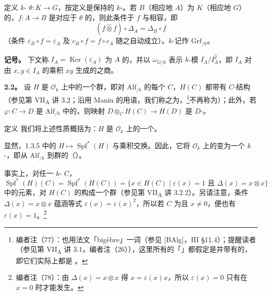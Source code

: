 \begin{SGAresult}{定义}{}
$k$- $\theta:K\to G$，按定义是保持的 $k$-。若 $B$（相应地 $A$）为 $K$（相应地 $G$）的，$f:A\to B$ 是对应于 $\theta$ 的，则此条件于 $f$ 与相容，即
\[
(f\widehat\otimes f)\circ\Delta_A=\Delta_B\circ f
\]
（条件 $\varepsilon_B\circ f=\varepsilon_A$ 及 $c_B\circ f=f\circ c_A$ 随之自动成立）。$k$-记作 $\mathrm{Grf}_{/k}$。
\end{SGAresult}

\textbf{记号。} 下文称 $I_A=\operatorname{Ker}(\varepsilon_A)$ 为 $A$ 的，并以 $\omega_{G/k}$ 表示 $k$-模 $I_A/\overline{I_A^2}$，即 $I_A$ 对由 $x,y\in I_A$ 的乘积 $xy$ 生成的之商。

\textbf{2.2。} 设 $H$ 是 $\mathscr O_k$ 上中的一个群，即对 $\mathrm{Alf}_{/k}$ 的每个 $C$，$H(C)$ 都带有 $C$-结构（参见第 VII\textsubscript{A} 讲 3.2；沿用 Manin 的用语，我们称之为，\footnote{编者注（77）：也用法文「bigèbre」一词（参见 [BAlg]，III §11.4）；提醒读者（参见第 VII\textsubscript{A} 讲 3.1，编者注（26）），这里所有的「」都假定是并带有的，即它们实际上都是 。}不再称为）；此外，若 $\varphi:C\to D$ 是 $\mathrm{Alf}_{/k}$ 中的，则映射 $D\otimes_C H(C)\to H(D)$ 是 $D$-。

\begin{SGAresult}{定义}{}
我们将上述性质概括为：$H$ 是 $\mathscr O_k$ 上的一个。
\end{SGAresult}

显然，1.3.5 中的 $H\mapsto\operatorname{Spf}^*(H)$ 与乘积交换。因此，它将 $\mathscr O_k$ 上的变为一个 $k$-，即从 $\mathrm{Alf}_{/k}$ 到群的（）。

事实上，对任一 $k$- $C$，
\[
\operatorname{Spf}^*(H)(C)=\operatorname{Spf}^*(H(C))=\{x\in H(C)\mid\varepsilon(x)=1\text{ 且 }\Delta(x)=x\otimes x\}
\]
中的元素，对 $H(C)$ 的构成一个群（参见第 VII\textsubscript{A} 讲 3.2.2）。另请注意，条件 $\Delta(x)=x\otimes x$ 蕴涵等式 $\varepsilon(x)=\varepsilon(x)^2$，所以若 $C$ 为且 $x\ne0$，便也有 $\varepsilon(x)=1$。\footnote{编者注（78）：由 $\Delta(x)=x\otimes x$ 得 $x=\varepsilon(x)x$，所以 $\varepsilon(x)=0$ 只有在 $x=0$ 时才能发生。}

